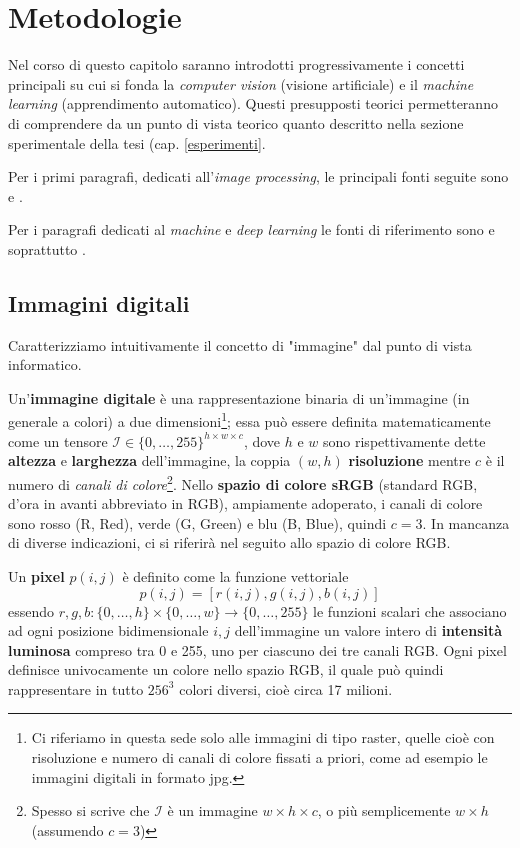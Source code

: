 \chapter{Metodologie}\label{teoria}
\pagestyle{fancy}
\fancyhf{}
\fancyhead[OL]{\rightmark}
\cfoot{\thepage}

Nel corso di questo capitolo saranno introdotti progressivamente i concetti principali su cui si fonda la \textit{computer vision} (visione artificiale) e il \textit{machine learning} (apprendimento automatico). Questi presupposti teorici permetteranno di comprendere da un punto di vista teorico quanto descritto nella sezione sperimentale della tesi (cap. \ref{esperimenti}.

Per i primi paragrafi, dedicati all'\textit{image processing}, le principali fonti seguite sono \cite{gianvito} e \cite{computerVision}.

Per i paragrafi dedicati al \textit{machine} e \textit{deep learning} le fonti di riferimento sono \cite{dlbook} e soprattutto \cite{cs231n}.


\section{Immagini digitali}
Caratterizziamo intuitivamente il concetto di "immagine" dal punto di vista informatico.

Un'\textbf{immagine digitale} è una rappresentazione binaria di un'immagine (in generale a colori) a due dimensioni\footnote{Ci riferiamo in questa sede solo alle immagini di tipo raster, quelle cioè con risoluzione e numero di canali di colore fissati a priori, come ad esempio le immagini digitali in formato jpg.}; essa può essere definita matematicamente come un tensore $\mathcal{I}\in\{0,\dots,255\}^{h\times w\times c}$, dove $h$ e $w$ sono rispettivamente dette \textbf{altezza} e \textbf{larghezza} dell'immagine, la coppia $(w,h)$ \textbf{risoluzione} mentre $c$ è il numero di \emph{canali di colore}\footnote{Spesso si scrive che $\mathcal{I}$ è un immagine $w\times h\times c$, o più semplicemente $w\times h$ (assumendo $c=3$)}. Nello \textbf{spazio di colore sRGB} (standard RGB, d'ora in avanti abbreviato in RGB), ampiamente adoperato, i canali di colore sono rosso (R, Red), verde (G, Green) e blu (B, Blue), quindi $c=3$. In mancanza di diverse indicazioni, ci si riferirà nel seguito allo spazio di colore RGB.

Un \textbf{pixel} $p(i,j)$ è definito come la funzione vettoriale
\[p(i,j)=[r(i,j),g(i,j),b(i,j)]\]
essendo $r,g,b:\{0,\dots,h\}\times\{0,\dots,w\}\to\{0,\dots,255\}$ le funzioni scalari che associano ad ogni posizione bidimensionale $i,j$ dell'immagine un valore intero di \textbf{intensità luminosa} compreso tra 0 e 255, uno per ciascuno dei tre canali RGB.
Ogni pixel definisce univocamente un colore nello spazio RGB, il quale può quindi rappresentare in tutto $256^{3}$ colori diversi, cioè circa 17 milioni.

